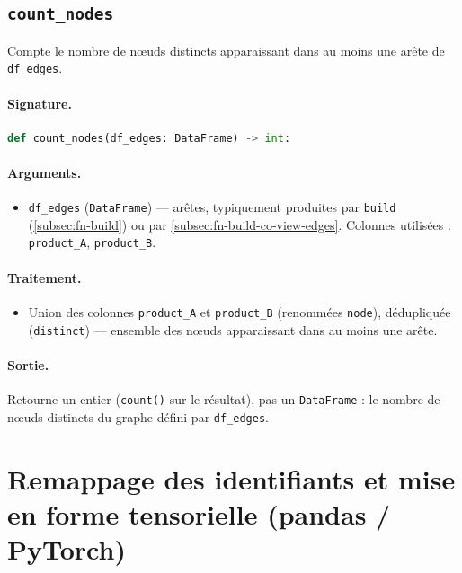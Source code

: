 \documentclass[11pt,a4paper]{article}
\newcommand{\code}[1]{\texttt{\small #1}}
\begin{document}
\subsection{\texttt{count\_nodes}}
\label{subsec:fn-count-nodes}

Compte le nombre de nœuds distincts apparaissant dans au moins une arête de
\code{df\_edges}.

\paragraph{Signature.}\leavevmode\par
\begin{lstlisting}[language=Python]
def count_nodes(df_edges: DataFrame) -> int:
\end{lstlisting}

\paragraph{Arguments.}
\begin{itemize}[nosep,leftmargin=*]
  \item \code{df\_edges} (\code{DataFrame}) --- arêtes, typiquement produites par
        \code{build} (\ref{subsec:fn-build}) ou par
        \ref{subsec:fn-build-co-view-edges}. Colonnes utilisées :
        \code{product\_A}, \code{product\_B}.
\end{itemize}

\paragraph{Traitement.}
\begin{itemize}[nosep,leftmargin=*]
  \item Union des colonnes \code{product\_A} et \code{product\_B} (renommées
        \code{node}), dédupliquée (\code{distinct}) --- ensemble des nœuds
        apparaissant dans au moins une arête.
\end{itemize}

\paragraph{Sortie.}
Retourne un entier (\code{count()} sur le résultat), pas un \code{DataFrame} : le
nombre de nœuds distincts du graphe défini par \code{df\_edges}.

\section{Remappage des identifiants et mise en forme tensorielle (pandas / PyTorch)}
\end{document}
